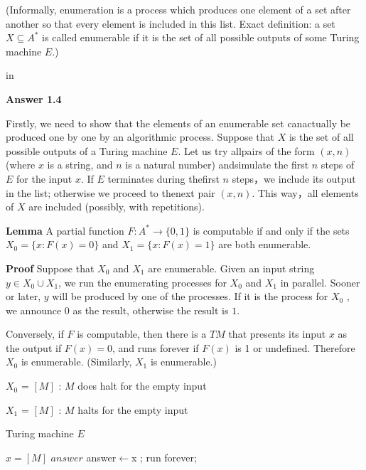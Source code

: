 \documentclass[11pt]{article}
\begin{document}
(Informally, enumeration is a process which produces one element of a set after another so that every element is included in this list. Exact definition: a set $X\subseteq A^{\ast} $ is called enumerable if it is the set of all possible outputs of some Turing machine $E$.)

 in

{\bf Answer 1.4}

Firstly, we need to show that the elements of an enumerable set canactually be produced one by one by an algorithmic process. Suppose that $X$ is the set of all possible outputs of a Turing machine $E$. Let us try allpairs of the form $(x, n)$ (where $x$ is a string, and $n$ is a natural number) andsimulate the first $n$ steps of $E$ for the input $x$. If $E$ terminates during thefirst $n$ steps，we include its output in the list; otherwise we proceed to thenext pair $(x, n)$. This way，all elements of $X$ are included (possibly, with repetitions).


{\bf Lemma} A partial function $F:A^{\ast}\to \{0, 1\}$ is computable if and only if the sets $X_0 = \{x :F(x) = 0\}$ and $X_1 = \{x : F(x) = 1\}$ are both enumerable.

{\bf Proof} Suppose that $X_0$ and $X_1$ are enumerable. Given an input string $y\in X_0 \cup X_1$, we run the enumerating processes for $X_0$ and $X_1$ in parallel. Sooner or later, $y$ will be produced by one of the processes. If it is the process for  $X_0$ , we announce $0$ as the result, otherwise the result is $1$.

Conversely, if $F$ is computable, then there is a $TM$ that presents its input $x$ as
the output if $F(x) = 0$, and runs forever if $F(x)$ is 1 or undefined. Therefore $X_0$ is
enumerable. (Similarly, $X_1$ is enumerable.)

\begin{center}
	$X_0$ = {$[M]$ : $M$ does halt for the empty input} 
	
	$X_1$ = {$[M]$ : $M$ halts for the empty input}
\end{center}

\begin{algorithm}[!h]  
	\caption{Turing machine $E$}  
	\label{alg:Framwork}  
	\begin{algorithmic}  
		\Require  
		$x=[M]$
		\Ensure
		$answer$
		\State answer$\gets$x ;
		\Else
		\State run forever;
		\EndIf
	\end{algorithmic}  
\end{algorithm}
\end{document}
